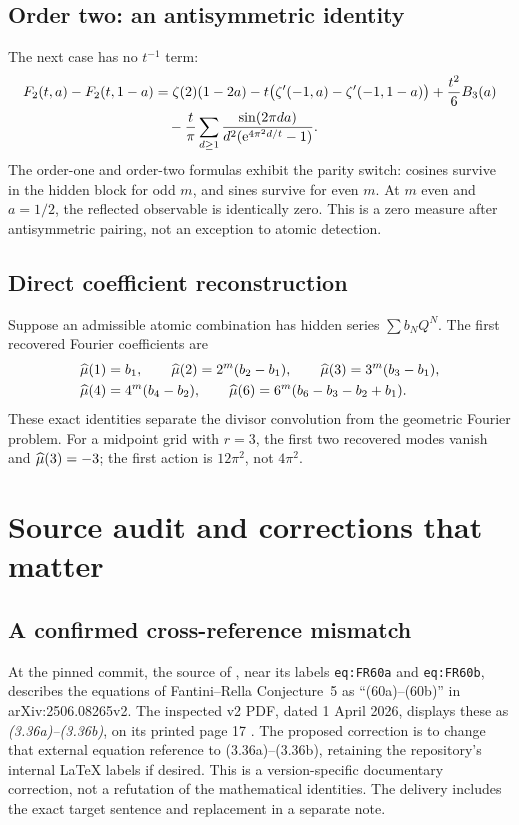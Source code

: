 \documentclass[11pt,a4paper]{article}
\numberwithin{equation}{section}
\theoremstyle{definition}\newtheorem{definition}[theorem]{Definition}
\theoremstyle{remark}\newtheorem{remark}[theorem]{Remark}
\begin{document}
\subsection{Order two: an antisymmetric identity}
The next case has no $t^{-1}$ term:
\begin{equation}
 \begin{split}
 F_2(t,a)-F_2(t,1-a)
 &=\zeta(2)(1-2a)
       -t\bigl(\zeta'(-1,a)-\zeta'(-1,1-a)\bigr)
       +\frac{t^2}{6}B_3(a)\\
 &\quad-\frac t\pi\sum_{d\ge1}
                     \frac{\sin(2\pi da)}{d^2(\mathrm e^{4\pi^2d/t}-1)}.
 \end{split}
 \label{eq:m2}
\end{equation}
The order-one and order-two formulas exhibit the parity switch:
cosines survive in the hidden block for odd $m$, and sines survive
for even $m$. At $m$ even and $a=1/2$, the reflected observable is
identically zero. This is a zero measure after antisymmetric pairing,
not an exception to atomic detection.

\subsection{Direct coefficient reconstruction}
Suppose an admissible atomic combination has hidden series
$\sum b_NQ^N$. The first recovered Fourier coefficients are
\begin{align*}
 \widehat\mu(1)&=b_1,\qquad
 \widehat\mu(2)=2^m(b_2-b_1),\qquad
 \widehat\mu(3)=3^m(b_3-b_1),\\
 \widehat\mu(4)&=4^m(b_4-b_2),\qquad
 \widehat\mu(6)=6^m(b_6-b_3-b_2+b_1).
\end{align*}
These exact identities separate the divisor convolution from the
geometric Fourier problem. For a midpoint grid with $r=3$, the first
two recovered modes vanish and $\widehat\mu(3)=-3$; the first action is
$12\pi^2$, not $4\pi^2$.

\section{Source audit and corrections that matter}
\label{sec:audit}

\subsection{A confirmed cross-reference mismatch}
At the pinned commit, the source of \cite{repoq}, near its labels
\texttt{eq:FR60a} and \texttt{eq:FR60b}, describes the equations of
Fantini--Rella Conjecture~5 as ``(60a)--(60b)'' in arXiv:2506.08265v2.
The inspected v2 PDF, dated 1 April 2026, displays these as
\emph{(3.36a)--(3.36b)}, on its printed page 17 \cite{fr}.
The proposed correction is to change that external equation reference
to (3.36a)--(3.36b), retaining the repository's internal LaTeX labels
if desired. This is a version-specific documentary correction, not a
refutation of the mathematical identities. The delivery includes the
exact target sentence and replacement in a separate note.
\end{document}
